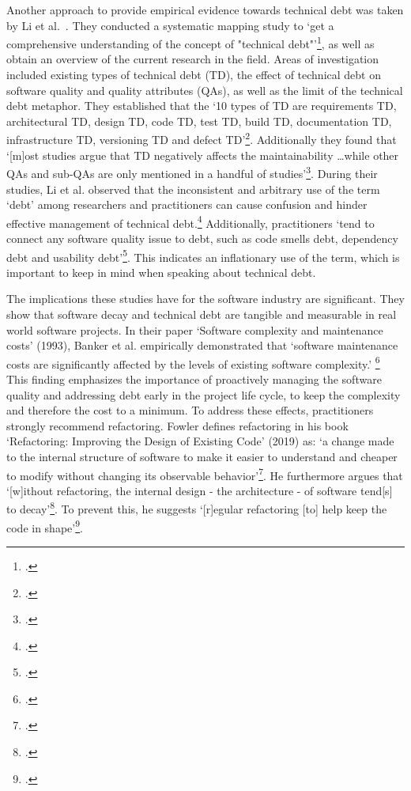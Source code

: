 Another approach to provide empirical evidence towards technical debt was taken by Li et al.\ . They conducted a systematic mapping study to `get a comprehensive understanding of the concept of "technical debt"'\footcite[194]{liSystematicMappingStudy2015}, as well as obtain an overview of the current research in the field.
Areas of investigation included existing types of technical debt (TD), the effect of technical debt on software quality and quality attributes (QAs), as well as the limit of the technical debt metaphor.
They established that the `10 types of TD are requirements TD, architectural TD, design TD, code TD, test TD, build TD, documentation TD, infrastructure TD, versioning TD and defect TD'\footcite[215]{liSystematicMappingStudy2015}.
Additionally they found that `[m]ost studies argue that TD negatively affects the maintainability \ldots while other QAs and sub-QAs are only mentioned in a handful of studies'\footcite[215]{liSystematicMappingStudy2015}.
During their studies,  Li et al. observed that the inconsistent and arbitrary use of the term `debt' among researchers and practitioners can cause confusion and hinder effective management of technical debt.\footcite[211]{liSystematicMappingStudy2015} Additionally, practitioners `tend to connect any software quality issue to debt, such as code smells debt, dependency debt and usability debt'\footcite[212]{liSystematicMappingStudy2015}.
This indicates an inflationary use of the term, which is important to keep in mind when speaking about technical debt.

The implications these studies have for the software industry are significant. They show that software decay and technical debt are tangible and measurable in real world software projects.
In their paper `Software complexity and maintenance costs' (1993), Banker et al. empirically demonstrated that `software maintenance costs are significantly affected by the levels of existing software complexity.' \footcite[12]{bankerSoftwareComplexityMaintenance1993}
This finding emphasizes the importance of proactively managing the software quality and addressing debt early in the project life cycle, to keep the complexity and therefore the cost to a minimum.
To address these effects, practitioners strongly recommend refactoring. Fowler defines refactoring in his book `Refactoring: Improving the Design of Existing Code' (2019) as: `a change made to the internal structure of software to make it  easier to understand and cheaper to modify without changing its observable behavior'\footcite[56]{fowlerRefactoringImprovingDesign2019}.
He furthermore argues that `[w]ithout refactoring, the internal design - the architecture - of software tend[s] to decay'\footcite[58]{fowlerRefactoringImprovingDesign2019}.
To prevent this, he suggests `[r]egular refactoring [to] help keep the code in shape'\footcite[58]{fowlerRefactoringImprovingDesign2019}.

